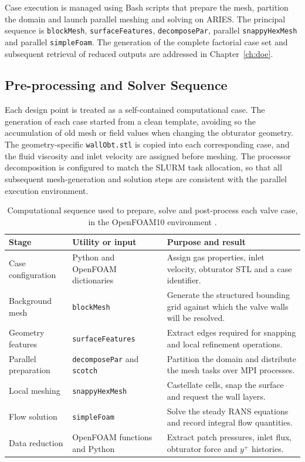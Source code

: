 Case execution is managed using Bash scripts that prepare the mesh, partition the domain and launch parallel meshing and solving on ARIES. The principal sequence is \texttt{blockMesh}, \texttt{surfaceFeatures}, \texttt{decomposePar}, parallel \texttt{snappyHexMesh} and parallel \texttt{simpleFoam}. The generation of the complete factorial case set and subsequent retrieval of reduced outputs are addressed in Chapter~\ref{ch:doe}.


\subsection{Pre-processing and Solver Sequence}
\label{sec:preprocessing_sequence}

Each design point is treated as a self-contained computational case. The generation of each case started from a clean template, avoiding so the accumulation of old mesh or field values when changing the obturator geometry. The geometry-specific \texttt{wallObt.stl} is copied into each corresponding case, and the fluid viscosity and inlet velocity are assigned before meshing. The processor decomposition is configured to match the SLURM task allocation, so that all subsequent mesh-generation and solution steps are consistent with the parallel execution environment.

\begin{table}[htbp]
\centering
\small
\begin{tabular}{@{}p{}p{}p{}@{}}
\toprule
\textbf{Stage} & \textbf{Utility or input} & \textbf{Purpose and result}\\
\midrule
Case configuration & Python and OpenFOAM dictionaries & Assign gas properties, inlet velocity, obturator STL and a case identifier.\\
Background mesh & \texttt{blockMesh} & Generate the structured bounding grid against which the valve walls will be resolved.\\
Geometry features & \texttt{surfaceFeatures} & Extract edges required for snapping and local refinement operations.\\
Parallel preparation & \texttt{decomposePar} and \texttt{scotch} & Partition the domain and distribute the mesh tasks over MPI processes.\\
Local meshing & \texttt{snappyHexMesh} & Castellate cells, snap the surface and request the wall layers.\\
Flow solution & \texttt{simpleFoam} & Solve the steady RANS equations and record integral flow quantities.\\
Data reduction & OpenFOAM functions and Python & Extract patch pressures, inlet flux, obturator force and $y^+$ histories.\\
\bottomrule
\end{tabular}
\caption{Computational sequence used to prepare, solve and post-process each valve case, in the OpenFOAM10 environment \cite{openfoam_user}.}
\label{tab:cfd_process}
\end{table}


